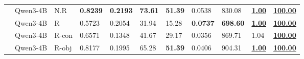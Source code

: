 \begin{table}[t]
\begin{tabular*}{\textwidth}{@{\extracolsep{\fill}}lllllllllll@{}}
			\midrule
			 & Qwen3-4B & N.R & \textbf{0.8239} & \textbf{0.2193} & \textbf{73.61} & \textbf{51.39} & 0.0538 & 830.08 & \underline{\textbf{1.00}} & \underline{\textbf{100.00}} \\
			& Qwen3-4B & R & 0.5723 & 0.2054 & 31.94 & 15.28 & \textbf{0.0737} & \textbf{698.60} & \underline{\textbf{1.00}} & \underline{\textbf{100.00}} \\
			& Qwen3-4B & R-con & 0.6571 & 0.1348 & 41.67 & 29.17 & 0.0356 & 869.71 & 1.04 & \underline{\textbf{100.00}} \\
			& Qwen3-4B & R-obj & 0.8177 & 0.1995 & 65.28 & \textbf{51.39} & 0.0406 & 904.31 & \underline{\textbf{1.00}} & \underline{\textbf{100.00}} \\
			\bottomrule
		\end{tabular*}
\end{table}

